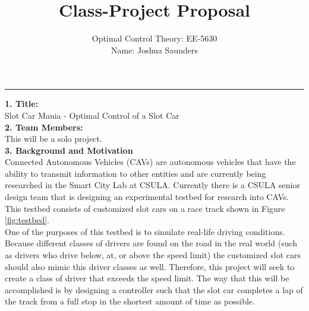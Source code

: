 \documentclass[12pt]{article}
\begin{document}


\title{Class-Project Proposal}

\author{Optimal Control Theory: EE-5630\\
Name: Joshua Saunders\\}

\maketitle

\hrule
\vspace{5mm}
\textbf{1. Title:}\\

Slot Car Mania - Optimal Control of a Slot Car\\

\textbf{2. Team Members:}\\

This will be a solo project.\\

\textbf{3. Background and Motivation}\\

Connected Autonomous Vehicles (CAVs) are autonomous vehicles that have the
ability to transmit information to other entities and are currently being
researched in the Smart City Lab at CSULA. Currently there is a CSULA senior
design team that is designing an experimental testbed for research into CAVs.
This testbed consists of customized slot cars on a race track shown in Figure
\ref{fig:testbed}.\\

One of the purposes of this testbed is to simulate real-life driving conditions.
Because different classes of drivers are found on the road in the real world
(such as drivers who drive below, at, or above the speed limit) the customized
slot cars should also mimic this driver classes as well. Therefore, this project
will seek to create a class of driver that exceeds the speed limit. The way that
this will be accomplished is by designing a controller such that the slot car
completes a lap of the track from a full stop in the shortest amount of time
as possible.\\
\end{document}
